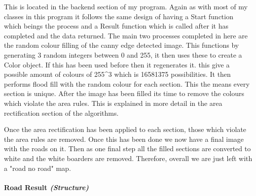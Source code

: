 \begin{FlushLeft}
    This is located in the backend section of my program. Again as with most of my classes in this program it follows the same design of having a Start function which beings the process and a Result function which is called after it has completed and the data returned. The main two processes completed in here are the random colour filling of the canny edge detected image. This functions by generating 3 random integers between 0 and 255, it then uses these to create a Color object. If this has been used before then it regenerates it. this give a possible amount of colours of 255^3 which is 16581375 possibilities. It then performs flood fill with the random colour for each section. This the means every section is unique. After the image has been filled its time to remove the colours which violate the area rules. This is explained in more detail in the area rectification section of the algorithms. \\ \bk

    Once the area rectification has been applied to each section, those which violate the area rules are removed. Once this has been done we now have a final image with the roads on it. Then as one final step all the filled sections are converted to white and the white boarders are removed. Therefore, overall we are just left with a "road no road" map.\\

    \bk

    \pagebreak
\paragraph{Road Result \textit{(Structure)}} \mbox{} \\

    \begin{figure}[H]
        \centering
    \end{figure}\\


\end{FlushLeft}
